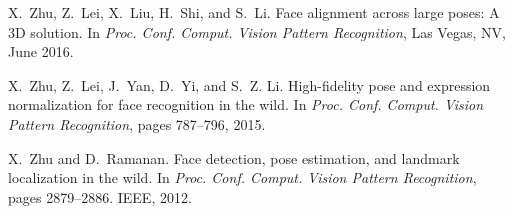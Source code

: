 \documentclass[10pt,twocolumn,letterpaper]{article}
\begin{document}
{\begin{thebibliography}{10}
X.~Zhu, Z.~Lei, X.~Liu, H.~Shi, and S.~Li.
\newblock Face alignment across large poses: A {3D} solution.
\newblock In {\em Proc. Conf. Comput. Vision Pattern Recognition}, Las Vegas,
  NV, June 2016.

X.~Zhu, Z.~Lei, J.~Yan, D.~Yi, and S.~Z. Li.
\newblock High-fidelity pose and expression normalization for face recognition
  in the wild.
\newblock In {\em Proc. Conf. Comput. Vision Pattern Recognition}, pages
  787--796, 2015.

X.~Zhu and D.~Ramanan.
\newblock Face detection, pose estimation, and landmark localization in the
  wild.
\newblock In {\em Proc. Conf. Comput. Vision Pattern Recognition}, pages
  2879--2886. IEEE, 2012.

\end{thebibliography}
}
\end{document}
